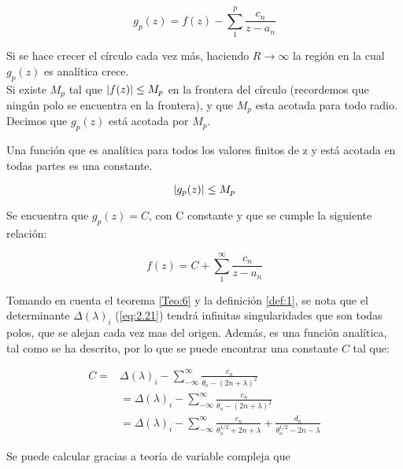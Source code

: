 \begin{equation}\label{eq:2.23}
    g_p(z)=f(z)-\sum^{p}_1 \frac{c_n}{z-a_n}
\end{equation}

Si se hace crecer el círculo cada vez más, haciendo $R \rightarrow \infty$ la región en la cual $g_p(z)$ es analítica crece.\\
Si existe $M_p$ tal que $\abs{f(z)}\leq M_p$ en la frontera del círculo (recordemos que ningún polo se encuentra en la frontera), y que $M_p$ esta acotada para todo radio. Decimos que $g_p(z)$ está acotada por $M_p$.

\begin{teo}\label{Teo:6}
 Una función que es analítica para todos los valores finitos de z y está acotada en todas partes es una constante.\cite{Philip}
\end{teo}

\begin{equation}\label{eq:2.24}
  \abs{g_p(z)} \leq M_p  
\end{equation}


Se encuentra que $g_p(z)=C$, con C constante y que se cumple la siguiente relación:

\begin{equation}\label{eq:2.25}
    f(z)=C+\sum^{\infty}_1 \frac{c_n}{z-a_n}
\end{equation}

Tomando en cuenta el teorema \ref{Teo:6} y la definición \ref{def:1}, se nota que el determinante $\Delta(\lambda)_i$ (\ref{eq:2.21}) tendrá infinitas singularidades que son todas polos, que se alejan cada vez mas del origen. Además, es una función analítica, tal como se ha descrito, por lo que se puede encontrar una constante $C$  tal que:
 
 \begin{equation}\label{eq:E.25}
 \begin{aligned}
 C=&\Delta(\lambda)_{i}-\sum^{\infty}_{-\infty} \frac{c_n}{\theta_o-(2n+\lambda)^2}\\
  &=\Delta(\lambda)_{i}-\sum^{\infty}_{-\infty} \frac{c_n}{\theta_o-(2n+\lambda)^2}\\
  &=\Delta(\lambda)_{i}-\sum^{\infty}_{-\infty} \frac{c_n}{\theta_o^{1/2}+2n+\lambda}+\frac{d_n}{\theta_o^{1/2}-2n-\lambda}
 \end{aligned}
 \end{equation}
 


Se puede calcular gracias a teoría de variable compleja que 

